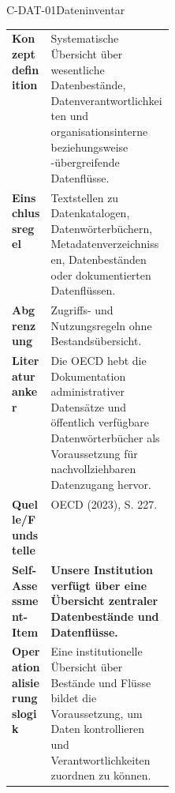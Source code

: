 \documentclass[10pt,a4paper]{article}
\begin{document}
\begin{codecard}{C-DAT-01}{Dateninventar}
\begin{tabularx}{\linewidth}{@{}>{\RaggedRight\arraybackslash\bfseries\color{DeepNavy}}p{0.245\linewidth}>{\RaggedRight\arraybackslash}X@{}}
Konzeptdefinition & Systematische Übersicht über wesentliche Datenbestände, Datenverantwortlichkeiten und organisationsinterne beziehungsweise -übergreifende Datenflüsse. \\
\arrayrulecolor{SoftRule}\hline
Einschlussregel & Textstellen zu Datenkatalogen, Datenwörterbüchern, Metadatenverzeichnissen, Datenbeständen oder dokumentierten Datenflüssen. \\
\arrayrulecolor{SoftRule}\hline
Abgrenzung & Zugriffs- und Nutzungsregeln ohne Bestandsübersicht. \\
\arrayrulecolor{SoftRule}\hline
Literaturanker & Die OECD hebt die Dokumentation administrativer Datensätze und öffentlich verfügbare Datenwörterbücher als Voraussetzung für nachvollziehbaren Datenzugang hervor. \\
\arrayrulecolor{SoftRule}\hline
Quelle/Fundstelle & OECD (2023), S. 227. \\
\arrayrulecolor{SoftRule}\hline
Self-Assessment-Item & \textbf{Unsere Institution verfügt über eine Übersicht zentraler Datenbestände und Datenflüsse.} \\
\arrayrulecolor{SoftRule}\hline
Operationalisierungslogik & Eine institutionelle Übersicht über Bestände und Flüsse bildet die Voraussetzung, um Daten kontrollieren und Verantwortlichkeiten zuordnen zu können. \\
\end{tabularx}
\end{codecard}
\end{document}
